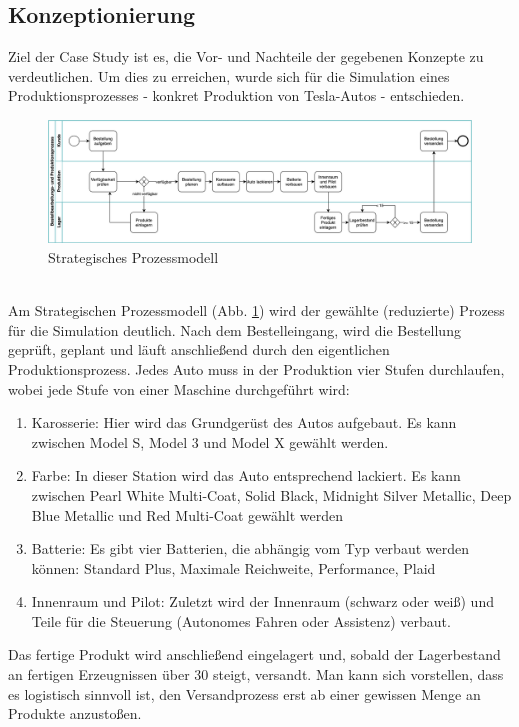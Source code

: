 \subsection{Konzeptionierung}
Ziel der Case Study ist es, die Vor- und Nachteile der gegebenen Konzepte zu verdeutlichen.
Um dies zu erreichen, wurde sich für die Simulation eines Produktionsprozesses - konkret Produktion von Tesla-Autos - entschieden.
\begin{figure}[]
    \centering
    \includegraphics[width=\textwidth]{ausarbeitung-latex/img/Prozessmodell.png}
    \caption{Strategisches Prozessmodell}
    \label{fig:bpmn}
\end{figure}
\\Am Strategischen Prozessmodell (Abb. \ref{fig:bpmn}) wird der gewählte (reduzierte) Prozess für die Simulation deutlich. Nach dem Bestelleingang, wird die Bestellung geprüft, geplant und läuft anschließend durch den eigentlichen Produktionsprozess. Jedes Auto muss in der Produktion vier Stufen durchlaufen, wobei jede Stufe von einer Maschine durchgeführt wird:
\begin{enumerate}
    \item Karosserie: Hier wird das Grundgerüst des Autos aufgebaut. Es kann zwischen Model S, Model 3 und Model X gewählt werden.
    \item Farbe: In dieser Station wird das Auto entsprechend lackiert. Es kann zwischen Pearl White Multi-Coat, Solid Black, Midnight Silver Metallic, Deep Blue Metallic und Red Multi-Coat gewählt werden
    \item Batterie: Es gibt vier Batterien, die abhängig vom Typ verbaut werden können: Standard Plus, Maximale Reichweite, Performance, Plaid
    \item Innenraum und Pilot: Zuletzt wird der Innenraum (schwarz oder weiß) und Teile für die Steuerung (Autonomes Fahren oder Assistenz) verbaut.
\end{enumerate} 
Das fertige Produkt wird anschließend eingelagert und, sobald der Lagerbestand an fertigen Erzeugnissen über 30 steigt, versandt. Man kann sich vorstellen, dass es logistisch sinnvoll ist, den Versandprozess erst ab einer gewissen Menge an Produkte anzustoßen.

